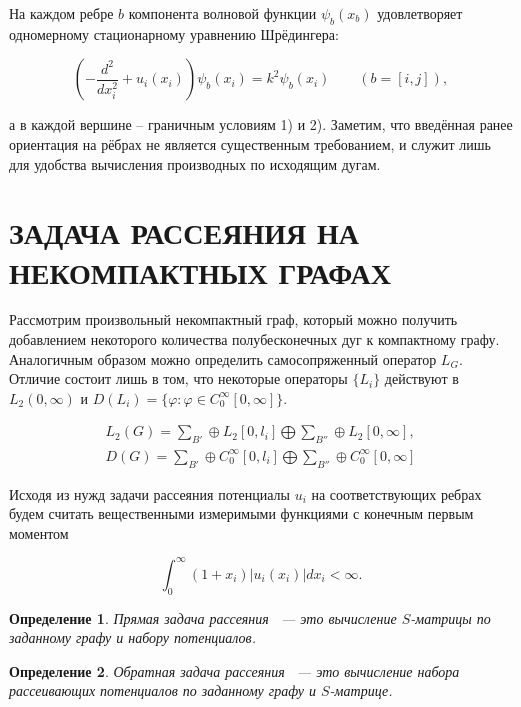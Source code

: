 \documentclass[a4 paper, 12 pt]{extarticle}
\newtheorem{Def}{Определение}[section]
\begin{document}
  На каждом ребре $b$ компонента волновой функции $\psi_b(x_b)$
  удовлетворяет одномерному стационарному уравнению Шрёдингера:

  \begin{equation}\label{Shred1}
   \left(-\frac{d^2}{dx_i^2} +
    u_i(x_i)\right)\psi_b(x_{i})=k^2\psi_b(x_{i})\qquad(b=[i,j]),
  \end{equation}

  а в каждой вершине -- граничным условиям 1) и 2). Заметим, что
  введённая ранее ориентация на рёбрах не является существенным
  требованием, и служит лишь для удобства вычисления производных по
  исходящим дугам.
  
  
  \section{ЗАДАЧА РАССЕЯНИЯ НА НЕКОМПАКТНЫХ ГРАФАХ}
  
  Рассмотрим произвольный некомпактный граф, который можно получить добавлением некоторого количества полубесконечных дуг к компактному графу.
  Аналогичным образом можно определить самосопряженный оператор
  $L_G$. Отличие состоит лишь в том, что некоторые операторы
  $\{L_i\}$ действуют в $L_2(0, \infty)$ и
  $D(L_i)=\{\varphi:\varphi\in C_0^\infty[0,\infty]\}$.
  
  \begin{gather*}
  L_2(G)=\sum_{B'}\oplus L_2[0, l_i]\bigoplus\sum_{B''}\oplus
  L_2[0,\infty],
  \\
  D(G)=\sum_{B'}\oplus C_0^\infty[0,l_i]\bigoplus\sum_{B''}\oplus
  C_0^\infty[0,\infty]
  \end{gather*}
  
  Исходя из нужд задачи рассеяния потенциалы $u_i$ на
  соответствующих ребрах будем считать вещественными измеримыми
  функциями с конечным первым моментом
  
  \begin{equation}
  \int_0^\infty(1+x_i)|u_i(x_i)|dx_i<\infty.
  \end{equation}
  
  \begin{Def}
  	Прямая задача рассеяния ~--- это вычисление $S$-матрицы по заданному  графу и набору потенциалов.
  \end{Def}
  
  \begin{Def}
  	Обратная задача рассеяния ~--- это вычисление набора рассеивающих потенциалов по заданному графу и $S$-матрице.
  \end{Def}
  
\end{document}

